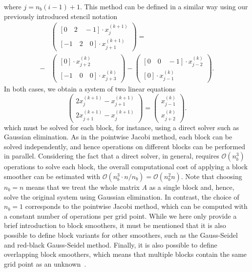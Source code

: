 where $j = n_b (i - 1) + 1$.
This method can be defined in a similar way using our previously introduced stencil notation
\begin{equation}
\begin{split}
	& \begin{pmatrix}
		\left[0 \quad 2 \quad -1 \right] \cdot x_{j}^{(k+1)} \\ \left[ -1 \quad 2 \quad 0 \right] \cdot x_{j+1}^{(k+1)} 
	\end{pmatrix}
	= \\ - & 
	\begin{pmatrix}
		\left[ 0 \right] \cdot x_{j+2}^{(k)} \\ \left[-1 \quad 0 \quad 0 \right] \cdot x_{j + 3}^{(k)}
	\end{pmatrix} -
	\begin{pmatrix}
		\left[0 \quad 0 \quad -1 \right] \cdot x_{j-2}^{(k)} \\ \left[ 0 \right] \cdot x_{j-1}^{(k)} 
	\end{pmatrix}.
\end{split}
\end{equation}
In both cases, we obtain a system of two linear equations
\begin{equation}
	\begin{pmatrix}
		2 x_{j}^{(k+1)} - x_{j+1}^{(k+1)} \\ 2 x_{j+1}^{(k+1)} - x_{j}^{(k+1)} 
	\end{pmatrix}
	=
	\begin{pmatrix}
		x_{j - 1}^{(k)} \\ x_{j + 2}^{(k)}
	\end{pmatrix}.
\end{equation}
which must be solved for each block, for instance, using a direct solver such as Gaussian elimination.
As in the pointwise Jacobi method, each block can be solved independently, and hence operations on different blocks can be performed in parallel. 
Considering the fact that a direct solver, in general, requires $\mathcal{O}(n_b^3)$ operations to solve each block, the overall computational cost of applying a block smoother can be estimated with $\mathcal{O}(n_b^3 \cdot n / n_b) = \mathcal{O}(n_b^2 n)$.
Note that choosing $n_b = n$ means that we treat the whole matrix $A$ as a single block and, hence, solve the original system using Gaussian elimination.
In contrast, the choice of $n_b = 1$ corresponds to the pointwise Jacobi method, which can be computed with a constant number of operations per grid point.
While we here only provide a brief introduction to block smoothers, it must be mentioned that it is also possible to define block variants for other smoothers, such as the Gauss-Seidel and red-black Gauss-Seidel method.
Finally, it is also possible to define overlapping block smoothers, which means that multiple blocks contain the same grid point as an unknown~\cite{trottenberg2000multigrid}.
\pagebreak
